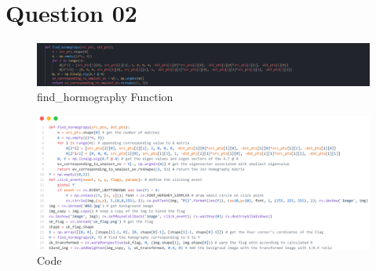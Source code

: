\documentclass[a4paper]{article}
\begin{document}
\section*{Question 02}
\begin{figure}[!htb]
  \centering
  \includegraphics[width=\textwidth]{images/find_hormo.png}
  \caption{find\_hormography Function}
  \label{find_hormography}
\end{figure}

\begin{figure}[!htb]
  \centering
  \includegraphics[width=\textwidth]{images/q2code.png}
  \caption{Code}
  \label{q2code}
\end{figure}
\end{document}
